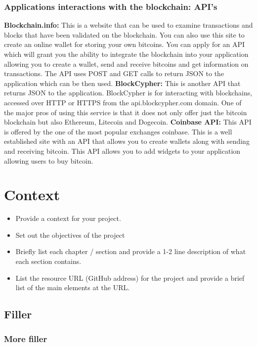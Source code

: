 \subsection{Applications interactions with the blockchain: API's}
\textbf{Blockchain.info:} This is a website that can be used to examine transactions and blocks that have been validated on the blockchain. You can also use this site to create an online wallet for storing your own bitcoins. You can apply for an API which will grant you the ability to integrate the blockchain into your application allowing you to create a wallet, send and receive bitcoins and get information on transactions. The API uses POST and GET calls to return JSON to the application which can be then used. \break
\textbf{BlockCypher:} This is another API that returns JSON to the application. BlockCypher is for interacting with blockchains, accessed over HTTP or HTTPS from the api.blockcypher.com domain. One of the major pros of using this service is that it does not only offer just the bitcoin blockchain but also Ethereum, Litecoin and Dogecoin. \break
\textbf{Coinbase API:} This API is offered by the one of the most popular exchanges coinbase. This is a well established site with an API that allows you to create wallets along with sending and receiving bitcoin. This API allows you to add widgets to your application allowing users to buy bitcoin.

\chapter{Context}
\begin{itemize}
\item Provide a context for your project.
\item Set out the objectives of the project
\item Briefly list each chapter / section and provide a 1-2 line description of what each section contains.
\item List the resource URL (GitHub address) for the project and provide a brief list of the main elements at the URL.
\end{itemize}

\section{Filler}


\subsection{More filler}



